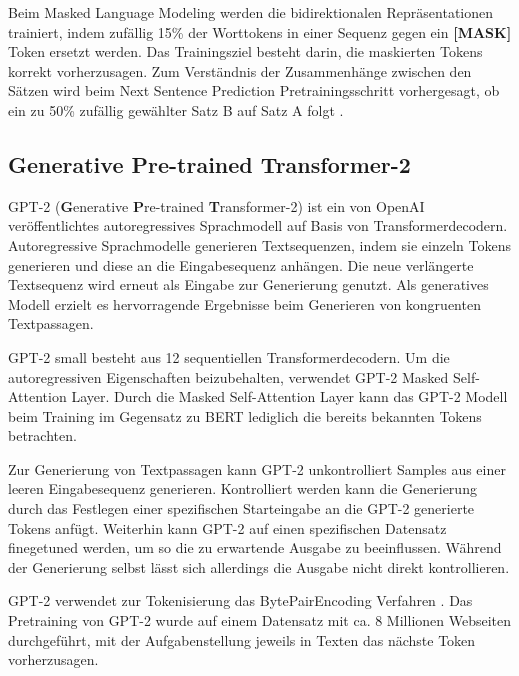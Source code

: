 Beim Masked Language Modeling werden die bidirektionalen Repräsentationen trainiert, indem zufällig 15\% der Worttokens in einer Sequenz gegen ein \textbf{[MASK]} Token ersetzt werden. Das Trainingsziel besteht darin, die maskierten Tokens korrekt vorherzusagen.
Zum Verständnis der Zusammenhänge zwischen den Sätzen wird beim Next Sentence Prediction Pretrainingsschritt vorhergesagt, ob ein zu 50\% zufällig gewählter Satz B auf Satz A folgt \citep{DBLP:journals/corr/abs-1810-04805}.

\pagebreak
\subsection{\textbf{G}enerative \textbf{P}re-trained \textbf{T}ransformer-2}
GPT-2 (\textbf{G}enerative \textbf{P}re-trained \textbf{T}ransformer-2) ist ein von OpenAI \citep{radford2019language} veröffentlichtes autoregressives Sprachmodell auf Basis von Transformerdecodern.
Autoregressive Sprachmodelle generieren Textsequenzen, indem sie einzeln Tokens generieren und diese an die Eingabesequenz anhängen. Die neue verlängerte Textsequenz wird erneut als Eingabe zur Generierung genutzt.
Als generatives Modell erzielt es hervorragende Ergebnisse beim Generieren von kongruenten Textpassagen.

GPT-2 small besteht aus 12 sequentiellen Transformerdecodern.
Um die autoregressiven Eigenschaften beizubehalten, verwendet GPT-2 Masked Self-Attention Layer. 
Durch die Masked Self-Attention Layer kann das GPT-2 Modell beim Training im Gegensatz zu BERT lediglich die bereits bekannten Tokens betrachten.

Zur Generierung von Textpassagen kann GPT-2 unkontrolliert Samples aus einer leeren Eingabesequenz generieren.
Kontrolliert werden kann die Generierung durch das Festlegen einer spezifischen Starteingabe an die GPT-2 generierte Tokens anfügt.
Weiterhin kann GPT-2 auf einen spezifischen Datensatz finegetuned werden, um so die zu erwartende Ausgabe zu beeinflussen.
Während der Generierung selbst lässt sich allerdings die Ausgabe nicht direkt kontrollieren.

GPT-2 verwendet zur Tokenisierung das BytePairEncoding Verfahren \citep{bytepairencoding}.
Das Pretraining von GPT-2 wurde auf einem Datensatz mit ca. 8 Millionen Webseiten durchgeführt, mit der Aufgabenstellung jeweils in Texten das nächste Token vorherzusagen.



\pagebreak
